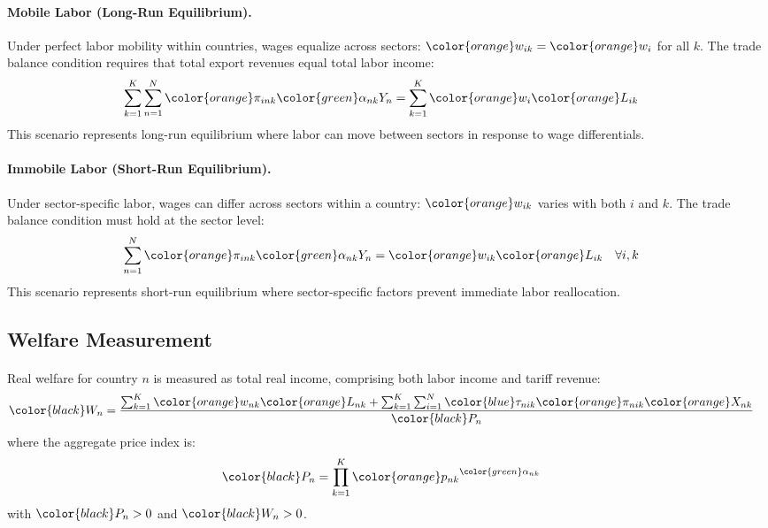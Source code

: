 \paragraph{\textbf{Mobile Labor (Long-Run Equilibrium).}} Under perfect labor mobility within countries, wages equalize across sectors: ${\color{orange}w_{ik}} = {\color{orange}w_{i}}$ for all $k$. The trade balance condition requires that total export revenues equal total labor income:
\begin{align*}
   \sum_{k=1}^{K} \sum_{n=1}^{N} {\color{orange}\pi_{ink}} {\color{green}\alpha_{nk}} Y_n  &= \sum_{k=1}^{K} {\color{orange}w_{i}} {\color{orange}L_{ik}}
\end{align*}
This scenario represents long-run equilibrium where labor can move between sectors in response to wage differentials.

\paragraph{\textbf{Immobile Labor (Short-Run Equilibrium).}} Under sector-specific labor, wages can differ across sectors within a country: ${\color{orange}w_{ik}}$ varies with both $i$ and $k$. The trade balance condition must hold at the sector level:
\begin{align*}
   \sum_{n=1}^{N} {\color{orange}\pi_{ink}} {\color{green}\alpha_{nk}} Y_n  &= {\color{orange}w_{ik}} {\color{orange}L_{ik}} \quad \forall i,k
\end{align*}
This scenario represents short-run equilibrium where sector-specific factors prevent immediate labor reallocation.

\subsection{Welfare Measurement}

\paragraph{} Real welfare for country $n$ is measured as total real income, comprising both labor income and tariff revenue:
\begin{align*}
    {\color{black}W_n} &= \frac{\sum_{k=1}^{K} {\color{orange}w_{nk}} {\color{orange}L_{nk}} + \sum_{k=1}^{K} \sum_{i=1}^{N} {\color{blue}\tau_{nik}} {\color{orange}\pi_{nik}} {\color{orange}X_{nk}}}{{\color{black}P_n}}
\end{align*}
where the aggregate price index is:
\begin{align*}
    {\color{black}P_n} &= \prod_{k=1}^{K} {\color{orange}p_{nk}}^{{\color{green}\alpha_{nk}}}
\end{align*}
with ${\color{black}P_n} > 0$ and ${\color{black}W_n} > 0$.

